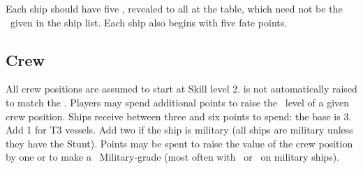 Each ship should have five \Aspects, revealed to all at the table, which need not be the \Aspects\ given in the ship list. Each ship also begins with five fate points.

\subsection{Crew}
\label{sec:Crew}

All crew positions are assumed to start at Skill level 2.  is not automatically raised to match the \Vshift. Players may spend additional points to raise the \Skill\ level of a given crew position. Ships receive between three and six points to spend: the base is 3. Add 1 for T3 vessels. Add two if the ship is military (all ships are military unless they have the  Stunt). Points may be spent to raise the value of the crew position by one or to make a \Skill\ Military-grade (most often with \Pilot\ or \Communications\ on military ships).

